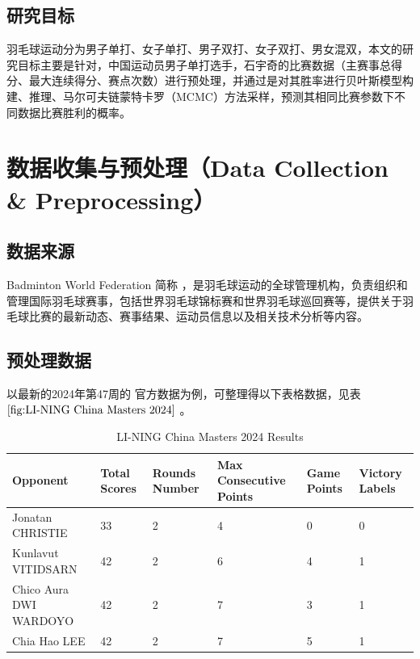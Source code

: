 \documentclass[12pt]{article}
\begin{document}
\subsection{研究目标}

羽毛球运动分为男子单打、女子单打、男子双打、女子双打、男女混双，本文的研究目标主要是针对，中国运动员男子单打选手，石宇奇的比赛数据（主赛事总得分、最大连续得分、赛点次数）进行预处理，并通过是对其胜率进行贝叶斯模型构建、推理、马尔可夫链蒙特卡罗（MCMC）方法采样，预测其相同比赛参数下不同数据比赛胜利的概率。


\section{数据收集与预处理（Data Collection \& Preprocessing）}
\subsection{数据来源}
Badminton World Federation 简称 \cite{bwf2024website}，是羽毛球运动的全球管理机构，负责组织和管理国际羽毛球赛事，包括世界羽毛球锦标赛和世界羽毛球巡回赛等，提供关于羽毛球比赛的最新动态、赛事结果、运动员信息以及相关技术分析等内容。


\subsection{预处理数据}

以最新的2024年第47周的 \cite{shiYuqi2024website} 官方数据为例，可整理得以下表格数据，见表 $\ref{fig:LI-NING China Masters 2024}$ 。
\begin{table}[h!]
	\centering
	\begin{tabularx}{\textwidth}{|l|X|X|X|X|X|}
	\hline
	\textbf{Opponent} & \textbf{Total Scores} & \textbf{Rounds Number} & \textbf{Max Consecutive Points} & \textbf{Game Points} & \textbf{Victory Labels} \\
	\hline
	Jonatan CHRISTIE & 33 & 2 & 4 & 0 & 0 \\
	Kunlavut VITIDSARN & 42 & 2 & 6 & 4 & 1 \\
	Chico Aura DWI WARDOYO & 42 & 2 & 7 & 3 & 1 \\
	Chia Hao LEE & 42 & 2 & 7 & 5 & 1 \\
	\hline
	\end{tabularx}
	\caption{LI-NING China Masters 2024 Results}
	\label{fig:LI-NING China Masters 2024}
\end{table}
\end{document}
